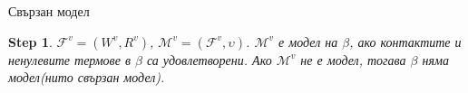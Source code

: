 \documentclass[14pt, aspectratio=169]{beamer}
\newtheorem{step}[theorem]{Step}
\newcommand\M{\mathcal{M}}
\newcommand\F{\mathcal{F}}
\newcommand{\pair}[2]{ \langle #1, #2 \rangle }
\newcommand{\pairXY}{ \pair{x}{y} }
\begin{document}
\begin{frame}{Свързан модел}
	\small
	\begin{step}
		$\F^v = (W^v, R^v)$, $\M^v = (\F^v, \upsilon)$. $\M^v$ е модел на $\beta$, ако контактите и ненулевите термове в $\beta$ са удовлетворени. Ако $\M^v$ не е модел, тогава $\beta$ няма модел(нито свързан модел).
	\end{step}



\end{frame}
\end{document}
